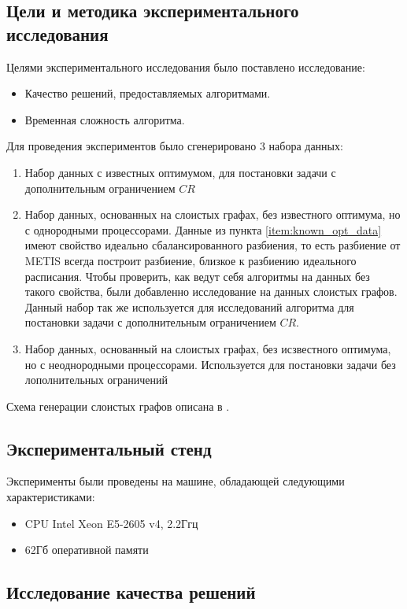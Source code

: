 \subsection{Цели и методика экспериментального исследования}
Целями экспериментального исследования было поставлено исследование:
\begin{itemize}
    \item Качество решений, предоставляемых алгоритмами.
    \item Временная сложность алгоритма.
\end{itemize}

Для проведения экспериментов было сгенерировано 3 набора данных:
\begin{enumerate}
    \item \label{item:known_opt_data} Набор данных с известных оптимумом, для постановки задачи с дополнительным ограничением $CR$
    \item Набор данных, основанных на слоистых графах, без известного оптимума, но с однородными процессорами. Данные из пункта \ref{item:known_opt_data} имеют свойство идеально сбалансированного разбиения, то есть разбиение от METIS всегда построит разбиение, близкое к разбиению идеального расписания. Чтобы проверить, как ведут себя алгоритмы на данных без такого свойства, были добавленно исследование на данных слоистых графов. Данный набор так же используется для исследований алгоритма для постановки задачи с дополнительным ограничением $CR$.
    \item Набор данных, основанный на слоистых графах, без исзвестного оптимума, но с неоднородными процессорами. Используется для постановки задачи без лополнительных ограничений
\end{enumerate}

Схема генерации слоистых графов описана в \cite{Canon_2019}.

\subsection{Экспериментальный стенд}

Эксперименты были проведены на машине, обладающей следующими характеристиками:
\begin{itemize}
    \item CPU Intel Xeon E5-2605 v4, 2.2Ггц
    \item 62Гб оперативной памяти
\end{itemize}

\subsection{Исследование качества решений}

